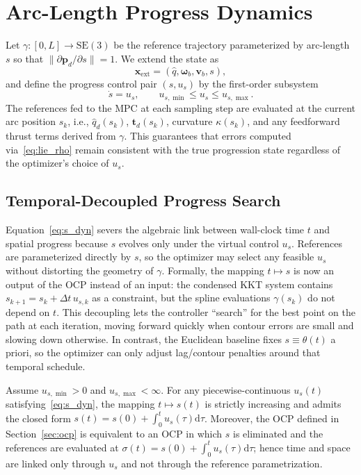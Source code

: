\documentclass[letterpaper, 10pt, conference]{IEEEtran}
\newcommand{\SE}{\mathrm{SE}(3)}
\newcommand{\dq}{\hat{q}}
\newcommand{\dqD}{\dq_d}
\begin{document}
\section{Arc-Length Progress Dynamics}
\label{sec:arc_length}
Let $\gamma : [0,L] \rightarrow \SE$ be the reference trajectory parameterized by arc-length $s$ so that $\|\partial \mathbf{p}_d / \partial s\| = 1$. We extend the state as
\begin{equation}
    \mathbf{x}_\mathrm{ext} = (\dq, \boldsymbol{\omega}_b, \mathbf{v}_b, s),
\end{equation}
and define the progress control pair $(s,u_s)$ by the first-order subsystem
\begin{equation}
    \dot{s} = u_s, \qquad u_{s,\min} \leq u_s \leq u_{s,\max}.
    \label{eq:s_dyn}
\end{equation}
The references fed to the MPC at each sampling step are evaluated at the current arc position $s_k$, i.e., $\dqD(s_k)$, $\mathbf{t}_d(s_k)$, curvature $\kappa(s_k)$, and any feedforward thrust terms derived from $\gamma$. This guarantees that errors computed via~\eqref{eq:lie_rho} remain consistent with the true progression state regardless of the optimizer's choice of $u_s$.

\subsection{Temporal-Decoupled Progress Search}
Equation~\eqref{eq:s_dyn} severs the algebraic link between wall-clock time $t$ and spatial progress because $s$ evolves only under the virtual control $u_s$. References are parameterized directly by $s$, so the optimizer may select any feasible $u_s$ without distorting the geometry of $\gamma$. Formally, the mapping $t \mapsto s$ is now an output of the OCP instead of an input: the condensed KKT system contains $s_{k+1} = s_k + \Delta t\, u_{s,k}$ as a constraint, but the spline evaluations $\gamma(s_k)$ do not depend on $t$. This decoupling lets the controller ``search'' for the best point on the path at each iteration, moving forward quickly when contour errors are small and slowing down otherwise. In contrast, the Euclidean baseline fixes $s \equiv \theta(t)$ a priori, so the optimizer can only adjust lag/contour penalties around that temporal schedule.

\begin{theorem}
Assume $u_{s,\min} > 0$ and $u_{s,\max} < \infty$. For any piecewise-continuous $u_s(t)$ satisfying~\eqref{eq:s_dyn}, the mapping $t \mapsto s(t)$ is strictly increasing and admits the closed form $s(t) = s(0) + \int_0^t u_s(\tau) \mathrm{d}\tau$. Moreover, the OCP defined in Section~\ref{sec:ocp} is equivalent to an OCP in which $s$ is eliminated and the references are evaluated at $\sigma(t) = s(0) + \int_0^t u_s(\tau) \mathrm{d}\tau$; hence time and space are linked only through $u_s$ and not through the reference parametrization.
\end{theorem}
\end{document}
